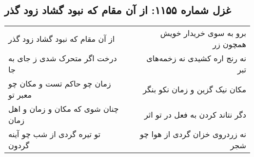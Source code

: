 \begin{center}
\section*{غزل شماره ۱۱۵۵: از آن مقام که نبود گشاد زود گذر}
\label{sec:1155}
\begin{longtable}{l p{0.5cm} r}
از آن مقام که نبود گشاد زود گذر
&&
برو به سوی خریدار خویش همچون زر
\\
درخت اگر متحرک شدی ز جای به جا
&&
نه رنج اره کشیدی نه زخمه‌های تبر
\\
زمان چو حاکم تست و مکان چو معبر تو
&&
مکان نیک گزین و زمان نکو بنگر
\\
چنان شوی که مکان و زمان و اهل زمان
&&
دگر نتاند کردن به فعل در تو اثر
\\
تو تیره گردی از شب چو آینه گردون
&&
نه زردروی خزان گردی از هوا چو شجر
\\
\end{longtable}
\end{center}
